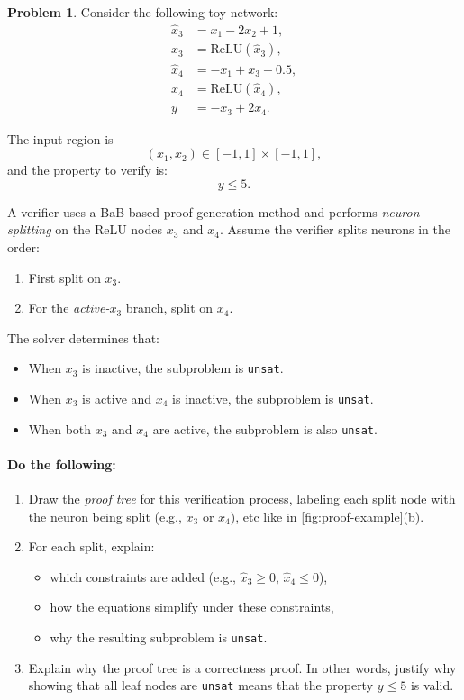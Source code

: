 \documentclass[oneside,11pt,dvipsnames]{book}
\numberwithin{equation}{section}
\theoremstyle{definition}
\newtheorem{problem}{Problem}[section]
\theoremstyle{remark}
\newcommand{\relu}[1]{\mathrm{ReLU}\left(#1\right)}
\newcommand{\unsat}{\texttt{unsat}}
\begin{document}
\begin{problem}\label{prob:proof-tree}
Consider the following toy network:
\[
\begin{aligned}
\hat{x}_3 &= x_1 - 2x_2 + 1,\\
x_3 &= \relu{\hat{x}_3},\\
\hat{x}_4 &= -x_1 + x_3 + 0.5,\\
x_4 &= \relu{\hat{x}_4},\\
y &= -x_3 + 2x_4.
\end{aligned}
\]

The input region is
\[
(x_1, x_2) \in [-1,1] \times [-1,1],
\]
and the property to verify is:
\[
y \le 5.
\]

A verifier uses a BaB-based proof generation method and performs \emph{neuron splitting} on the ReLU nodes $x_3$ and $x_4$.
Assume the verifier splits neurons in the order:
\begin{enumerate}
    \item First split on $x_3$.
    \item For the \emph{active-$x_3$} branch, split on $x_4$.
\end{enumerate}

The solver determines that:
\begin{itemize}
    \item When $x_3$ is inactive, the subproblem is \unsat.
    \item When $x_3$ is active and $x_4$ is inactive, the subproblem is \unsat.
    \item When both $x_3$ and $x_4$ are active, the subproblem is also \unsat.
\end{itemize}

\paragraph{Do the following:}
\begin{enumerate}
    \item Draw the \emph{proof tree} for this verification process, labeling each split node with the neuron being split (e.g., $x_3$ or $x_4$), etc like in \autoref{fig:proof-example}(b).

    \item For each split, explain:
    \begin{itemize}
        \item which constraints are added (e.g., $\hat{x}_3 \ge 0$, $\hat{x}_4 \le 0$),
        \item how the equations simplify under these constraints,
        \item why the resulting subproblem is \unsat{}.
    \end{itemize}

    \item Explain why the proof tree is a correctness proof.  In other words, justify why showing that all leaf nodes are \unsat{} means that the property $y \le 5$ is valid.
\end{enumerate}
\end{problem}
\end{document}
